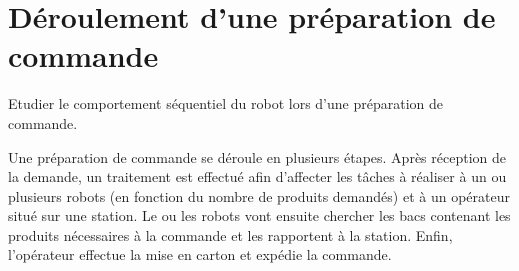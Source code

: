 %
%
%

\section*{Déroulement d'une préparation de commande}
\begin{obj}
Etudier le comportement séquentiel du robot lors d'une préparation de commande.
\end{obj}


Une préparation de commande se déroule en plusieurs étapes. Après réception de la demande, un traitement est effectué afin d'affecter les tâches à réaliser à un ou plusieurs robots (en fonction du nombre de produits demandés) et à un opérateur situé sur une station. Le ou les robots vont ensuite chercher les bacs contenant les produits nécessaires à la commande et les rapportent à la station. Enfin, l'opérateur effectue la mise en carton et expédie la commande.

